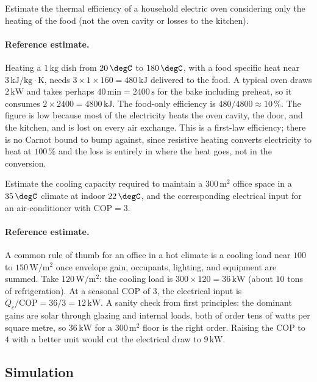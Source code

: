\begin{exercise}
Estimate the thermal efficiency of a household electric oven
considering only the heating of the food (not the oven cavity or
losses to the kitchen).

\paragraph{Reference estimate.} Heating a $1\,\text{kg}$ dish from
$20\,\degC$ to $180\,\degC$, with a food specific heat near $3\,\text{kJ}
/\text{kg}\cdot\text{K}$, needs $3 \times 1 \times 160 = 480\,\text{kJ}$
delivered to the food. A typical oven draws $2\,\text{kW}$ and takes
perhaps $40\,\text{min} = 2400\,\text{s}$ for the bake including
preheat, so it consumes $2 \times 2400 = 4800\,\text{kJ}$. The
food-only efficiency is $480/4800 \approx 10\,\%$. The figure is low
because most of the electricity heats the oven cavity, the door, and
the kitchen, and is lost on every air exchange. This is a first-law
efficiency; there is no Carnot bound to bump against, since resistive
heating converts electricity to heat at $100\,\%$ and the loss is
entirely in where the heat goes, not in the conversion.
\end{exercise}

\begin{exercise}
Estimate the cooling capacity required to maintain a $300\,\text{m}^2$
office space in a $35\,\degC$ climate at indoor $22\,\degC$, and the
corresponding electrical input for an air-conditioner with
$\text{COP} = 3$.
\paragraph{Reference estimate.} A common rule of thumb for an office in
a hot climate is a cooling load near $100$ to $150\,\text{W}/\text{m}^2$
once envelope gain, occupants, lighting, and equipment are summed. Take
$120\,\text{W}/\text{m}^2$: the cooling load is $300 \times 120 =
36\,\text{kW}$ (about $10$ tons of refrigeration). At a seasonal COP of
$3$, the electrical input is $\dot Q_c/\text{COP} = 36/3 = 12\,\text{kW}$.
A sanity check from first principles: the dominant gains are solar
through glazing and internal loads, both of order tens of watts per
square metre, so $36\,\text{kW}$ for a $300\,\text{m}^2$ floor is the
right order. Raising the COP to $4$ with a better unit would cut the
electrical draw to $9\,\text{kW}$.
\end{exercise}

\subsection*{Simulation}

